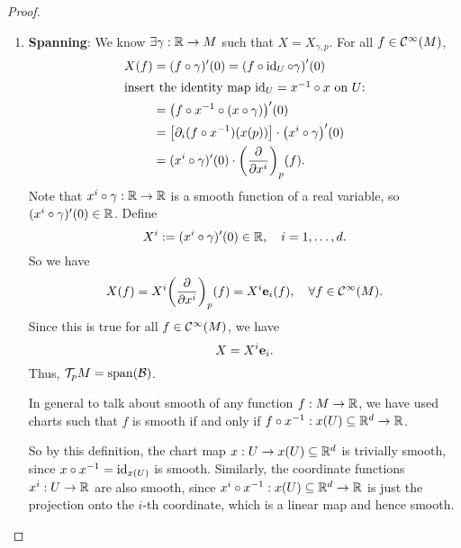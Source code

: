 \begin{proof}
    \begin{enumerate}
        \item \textbf{Spanning}: We know \(\exists \gamma: \mathbb R \to M\) such that \(X = X_{\gamma, p}\). For all \(f \in \mathcal C^\infty(M)\),
              \begin{align*}
                  X(f) & = (f \circ \gamma)'(0) = \qty(f \circ \operatorname{id}_U \circ \gamma)'(0)              \\
                  \shortintertext{insert the identity map \(\operatorname{id}_U = x^{-1} \circ x\) on \(U\):}
                       & = \qty(f \circ x^{-1} \circ (x \circ \gamma))'(0)                          \\
                       & = \qty[\partial_i (f \circ x^{-1})(x(p))] \cdot \qty(x^i \circ \gamma)'(0) \\
                       & = (x^i \circ \gamma)'(0) \cdot \qty(\pdv{x^i})_p (f).
              \end{align*}
              Note that \(x^i \circ \gamma: \mathbb R \to \mathbb R\) is a smooth function of a real variable, so \((x^i \circ \gamma)'(0) \in \mathbb R\). Define
              \begin{equation}
                  X^i := (x^i \circ \gamma)'(0) \in \mathbb R, \quad i = 1, \ldots, d.
              \end{equation}
              So we have
              \begin{equation}
                  X(f) = X^i \qty(\pdv{x^i})_p (f) = X^i \vb{e}_i(f), \quad \forall f \in \mathcal C^\infty(M).
              \end{equation}
              Since this is true for all \(f \in \mathcal C^\infty(M)\), we have
              \begin{equation}
                  X = X^i \vb{e}_i.
              \end{equation}
              Thus, \(\mathcal T_p M = \operatorname{span}(\mathcal B)\).

              \begin{remark}
                  In general to talk about smooth of any function \(f: M \to \mathbb R\), we have used charts such that \(f\) is smooth if and only if \(f \circ x^{-1}: x(U) \subseteq \mathbb R^d \to \mathbb R\).

                  So by this definition, the chart map \(x: U \to x(U) \subseteq \mathbb R^d\) is trivially smooth, since \(x \circ x^{-1} = \operatorname{id}_{x(U)}\) is smooth. Similarly, the coordinate functions \(x^i: U \to \mathbb R\) are also smooth, since \(x^i \circ x^{-1}: x(U) \subseteq \mathbb R^d \to \mathbb R\) is just the projection onto the \(i\)-th coordinate, which is a linear map and hence smooth.
              \end{remark}


\end{enumerate}
\end{proof}
